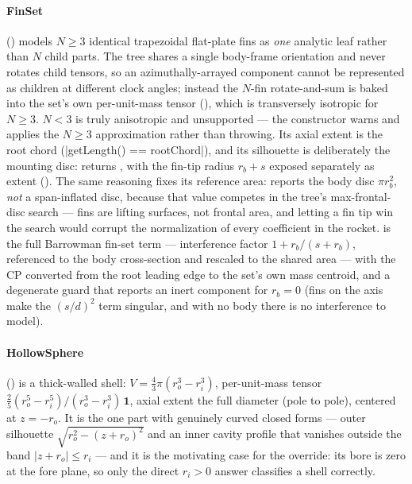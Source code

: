 \paragraph{FinSet} () models $N \ge 3$ identical trapezoidal
flat-plate fins as \emph{one} analytic leaf rather than $N$ child parts. The tree shares a single
body-frame orientation and never rotates child tensors, so an azimuthally-arrayed component cannot
be represented as children at different clock angles; instead the $N$-fin rotate-and-sum is baked
into the set's own per-unit-mass tensor (), which is
transversely isotropic for $N \ge 3$. $N < 3$ is truly anisotropic and unsupported --- the
constructor warns and applies the $N \ge 3$ approximation rather than throwing. Its axial extent
is the root chord (\cppinline|getLength() == rootChord|), and its silhouette is deliberately the
mounting disc:  returns , with the fin-tip radius
$r_b + s$ exposed separately as extent (). The same reasoning fixes its
reference area:  reports the body disc $\pi r_b^2$, \emph{not} a
span-inflated disc, because that value competes in the tree's max-frontal-disc search --- fins are
lifting surfaces, not frontal area, and letting a fin tip win the search would corrupt the
normalization of every coefficient in the rocket.  is the full Barrowman fin-set
term --- interference factor $1 + r_b/(s + r_b)$, referenced to the body cross-section and
rescaled to the shared area --- with the CP converted from the root leading edge to the set's own
mass centroid, and a degenerate guard that reports an inert component for $r_b = 0$ (fins on the
axis make the $(s/d)^2$ term singular, and with no body there is no interference to model).

\paragraph{HollowSphere} () is a thick-walled shell:
$V = \tfrac{4}{3}\pi(r_o^3 - r_i^3)$, per-unit-mass tensor
$\tfrac{2}{5}(r_o^5 - r_i^5)/(r_o^3 - r_i^3)\,\mathbf{1}$, axial extent the full diameter
(pole to pole), centered at $z = -r_o$. It is the one part with genuinely curved closed forms ---
outer silhouette $\sqrt{r_o^2 - (z + r_o)^2}$ and an inner cavity profile that vanishes outside
the band $|z + r_o| \le r_i$ --- and it is the motivating case for the  override:
its bore is zero at the fore plane, so only the direct $r_i > 0$ answer classifies a shell
correctly.

